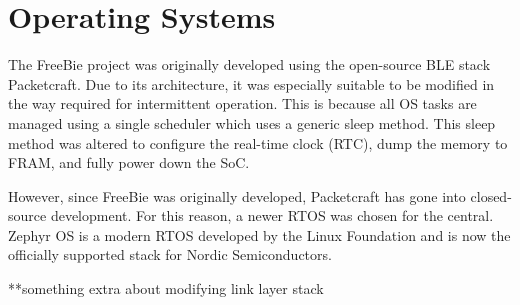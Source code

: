 \section{Operating Systems}
The FreeBie project was originally developed using the open-source BLE stack Packetcraft. Due to its architecture, it was especially suitable to be modified in the way required for intermittent operation. This is because all OS tasks are managed using a single scheduler which uses a generic sleep method. This sleep method was altered to configure the real-time clock (RTC), dump the memory to FRAM, and fully power down the SoC.

However, since FreeBie was originally developed, Packetcraft has gone into closed-source development. For this reason, a newer RTOS was chosen for the central. Zephyr OS is a modern RTOS developed by the Linux Foundation and is now the officially supported stack for Nordic Semiconductors.

**something extra about modifying link layer stack